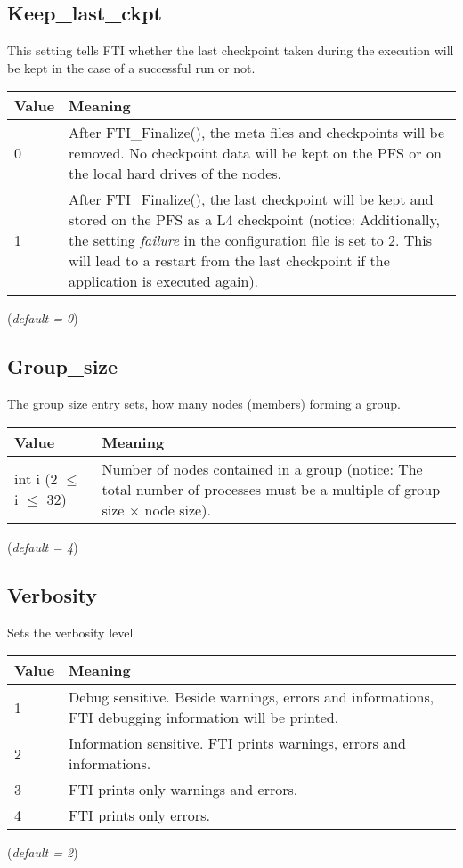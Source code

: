 \documentclass{refrep}
\begin{document}
\subsection{Keep\_last\_ckpt}\label{subsec:keeplastckpt}
This setting tells FTI whether the last checkpoint taken during the execution will be kept in the case of a successful run or not.
\begin{center}
\begin{tabular}[h!]{|p{}|p{}|}
\hline
\textbf{Value} & \textbf{Meaning} \\ \hline
0 & After {\asciifamily FTI\_Finalize()}, the meta files and checkpoints will be removed. No checkpoint data will be kept on the PFS or on the local hard drives of the nodes.  \\ \hline
1 & After {\asciifamily FTI\_Finalize()}, the last checkpoint will be kept and stored on the PFS as a L4 checkpoint (notice: Additionally, the setting \emph{failure} in the configuration file is set to 2. This will lead to a restart from the last checkpoint if the application is executed again).  \\ \hline
\end{tabular}
\end{center}
(\textit{default = 0})
\subsection{Group\_size}\label{subsec:groupsize}
The group size entry sets, how many nodes (members) forming a group.
\begin{center}
\begin{tabular}[h!]{|p{}|p{}|}
\hline
\textbf{Value} & \textbf{Meaning} \\ \hline
int i (2 $\leq$ i $\leq$ 32) & Number of nodes contained in a group (notice: The total number of processes must be a multiple of group size $\times$ node size). \\ \hline
\end{tabular}
\end{center}
(\textit{default = 4})
\subsection{Verbosity}\label{subsec:verbosity}
Sets the verbosity level
\begin{center}
\begin{tabular}[h!]{|p{}|p{}|}
\hline
\textbf{Value} & \textbf{Meaning} \\ \hline
1 & Debug sensitive. Beside warnings, errors and informations, FTI debugging information will be printed.  \\ \hline
2 & Information sensitive. FTI prints warnings, errors and informations. \\ \hline
3 & FTI prints only warnings and errors.  \\ \hline
4 & FTI prints only errors.  \\ \hline
\end{tabular}
\end{center}
(\textit{default = 2})
\end{document}
